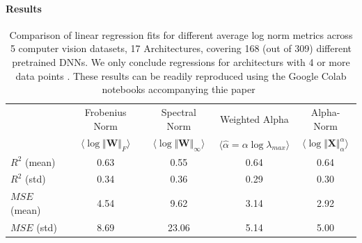 \paragraph{Results}
\begin{table}[t]
\small
\begin{center}
\begin{tabular}{|p{1in}|c|c|c|c|}
\hline
    & Frobenius Norm & Spectral Norm & Weighted Alpha & Alpha-Norm \\
    & $\langle\log\Vert\mathbf{W}\Vert_{F}\rangle$ & $\langle\log\Vert\mathbf{W}\Vert_{\infty}\rangle$ & $\langle\hat{\alpha}=\alpha\log\lambda_{max}\rangle$ & $\langle\log\Vert\mathbf{X}\Vert^{\alpha}_{\alpha}\rangle$ \\
\hline
$R^{2}$ (mean) & 0.63 &0.55 &0.64 &0.64 \\
$R^{2}$ (std)  & 0.34 &0.36 &0.29 &0.30 \\
\hline
$MSE$ (mean)   & 4.54 &9.62 &3.14 &2.92 \\
$MSE$ (std)    & 8.69 &23.06 &5.14 &5.00 \\
\hline
\end{tabular}
\end{center}
\caption{Comparison of linear regression fits for different average log norm metrics across 5 computer vision datasets, 17 Architectures, covering 168 (out of 309) different pretrained DNNs.  We only conclude regressions for architecturs with 4 or more data points .  These results can be readily reproduced using the Google Colab notebooks accompanying thie paper~\cite{notebooks}}
\label{table:results}
\end{table}


